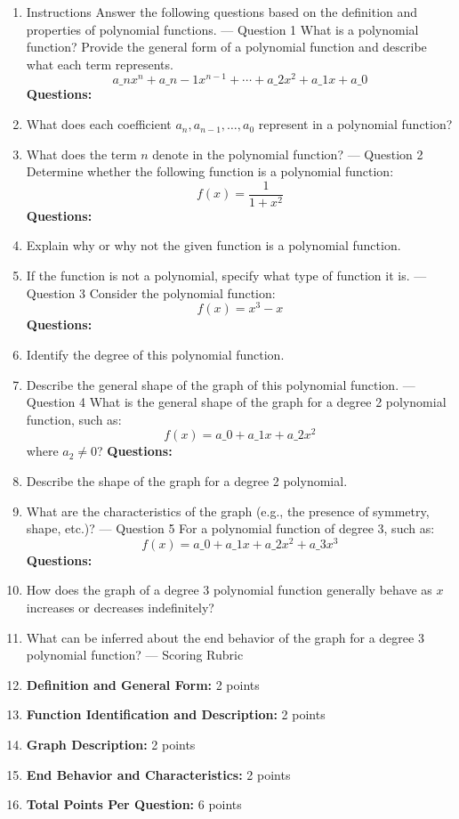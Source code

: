 \begin{enumerate}
    \item Instructions Answer the following questions based on the definition and properties of polynomial functions. --- Question 1 What is a polynomial function? Provide the general form of a polynomial function and describe what each term represents. $$ a\_n x^n + a\_{n-1} x^{n-1} + \cdots + a\_2 x^2 + a\_1 x + a\_0 $$ \textbf{Questions:}
    \item What does each coefficient $a_n, a_{n-1}, \ldots, a_0$ represent in a polynomial function?
    \item What does the term $n$ denote in the polynomial function? --- Question 2 Determine whether the following function is a polynomial function: $$ f(x) = \frac{1}{1 + x^2} $$ \textbf{Questions:}
    \item Explain why or why not the given function is a polynomial function.
    \item If the function is not a polynomial, specify what type of function it is. --- Question 3 Consider the polynomial function: $$ f(x) = x^3 - x $$ \textbf{Questions:}
    \item Identify the degree of this polynomial function.
    \item Describe the general shape of the graph of this polynomial function. --- Question 4 What is the general shape of the graph for a degree 2 polynomial function, such as: $$ f(x) = a\_0 + a\_1 x + a\_2 x^2 $$ where $a_2 \neq 0$? \textbf{Questions:}
    \item Describe the shape of the graph for a degree 2 polynomial.
    \item What are the characteristics of the graph (e.g., the presence of symmetry, shape, etc.)? --- Question 5 For a polynomial function of degree 3, such as: $$ f(x) = a\_0 + a\_1 x + a\_2 x^2 + a\_3 x^3 $$ \textbf{Questions:}
    \item How does the graph of a degree 3 polynomial function generally behave as $x$ increases or decreases indefinitely?
    \item What can be inferred about the end behavior of the graph for a degree 3 polynomial function? --- Scoring Rubric
    \item \textbf{Definition and General Form:} 2 points
    \item \textbf{Function Identification and Description:} 2 points
    \item \textbf{Graph Description:} 2 points
    \item \textbf{End Behavior and Characteristics:} 2 points
    \item \textbf{Total Points Per Question:} 6 points
\end{enumerate}

